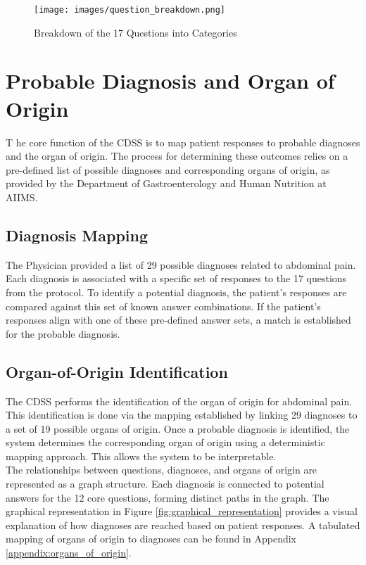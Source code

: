 \begin{figure}[h]
    \centering
    \texttt{[image: images/question\_breakdown.png]}
    \caption{Breakdown of the 17 Questions into Categories}
    \label{fig:question_breakdown}
\end{figure}

\section{Probable Diagnosis and Organ of Origin}
\lettrine{T}{ }he core function of the CDSS is to map patient responses to probable diagnoses and the organ of origin. The process for determining these outcomes relies on a pre-defined list of possible diagnoses and corresponding organs of origin, as provided by the Department of Gastroenterology and Human Nutrition at AIIMS.

\subsection{Diagnosis Mapping}
The Physician provided a list of 29 possible diagnoses related to abdominal pain. Each diagnosis is associated with a specific set of responses to the 17 questions from the protocol. To identify a potential diagnosis, the patient's responses are compared against this set of known answer combinations. If the patient's responses align with one of these pre-defined answer sets, a match is established for the probable diagnosis.

\subsection{Organ-of-Origin Identification}
The CDSS performs the identification of the organ of origin for abdominal pain. This identification is done via the mapping established by linking 29 diagnoses to a set of 19 possible organs of origin. Once a probable diagnosis is identified, the system determines the corresponding organ of origin using a \textcolor{TUMBlue}{deterministic mapping} approach. This allows the system to be interpretable.\\[\baselineskip]

\noindent The relationships between questions, diagnoses, and organs of origin are represented as a graph structure. Each diagnosis is connected to potential answers for the 12 core questions, forming distinct paths in the graph. The graphical representation in Figure \ref{fig:graphical_representation} provides a visual explanation of how diagnoses are reached based on patient responses. A tabulated mapping of organs of origin to diagnoses can be found in Appendix \ref{appendix:organs_of_origin}.\\[\baselineskip]

